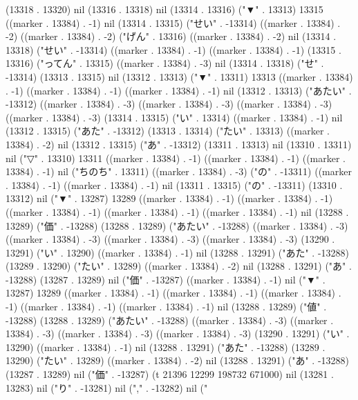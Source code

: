 (13318 . 13320) nil (13316 . 13318) nil (13314 . 13316) ("▼" . 13313) 13315 ((marker . 13384) . -1) nil (13314 . 13315) ("せい" . -13314) ((marker . 13384) . -2) ((marker . 13384) . -2) ("げん" . 13316) ((marker . 13384) . -2) nil (13314 . 13318) ("せい" . -13314) ((marker . 13384) . -1) ((marker . 13384) . -1) (13315 . 13316) ("ってん" . 13315) ((marker . 13384) . -3) nil (13314 . 13318) ("せ" . -13314) (13313 . 13315) nil (13312 . 13313) ("▼" . 13311) 13313 ((marker . 13384) . -1) ((marker . 13384) . -1) ((marker . 13384) . -1) nil (13312 . 13313) ("あたい" . -13312) ((marker . 13384) . -3) ((marker . 13384) . -3) ((marker . 13384) . -3) ((marker . 13384) . -3) (13314 . 13315) ("い" . 13314) ((marker . 13384) . -1) nil (13312 . 13315) ("あた" . -13312) (13313 . 13314) ("たい" . 13313) ((marker . 13384) . -2) nil (13312 . 13315) ("あ" . -13312) (13311 . 13313) nil (13310 . 13311) nil ("▽" . 13310) 13311 ((marker . 13384) . -1) ((marker . 13384) . -1) ((marker . 13384) . -1) nil ("ちのち" . 13311) ((marker . 13384) . -3) ("の" . -13311) ((marker . 13384) . -1) ((marker . 13384) . -1) nil (13311 . 13315) ("の" . -13311) (13310 . 13312) nil ("▼" . 13287) 13289 ((marker . 13384) . -1) ((marker . 13384) . -1) ((marker . 13384) . -1) ((marker . 13384) . -1) ((marker . 13384) . -1) nil (13288 . 13289) ("価" . -13288) (13288 . 13289) ("あたい" . -13288) ((marker . 13384) . -3) ((marker . 13384) . -3) ((marker . 13384) . -3) ((marker . 13384) . -3) (13290 . 13291) ("い" . 13290) ((marker . 13384) . -1) nil (13288 . 13291) ("あた" . -13288) (13289 . 13290) ("たい" . 13289) ((marker . 13384) . -2) nil (13288 . 13291) ("あ" . -13288) (13287 . 13289) nil ("価" . -13287) ((marker . 13384) . -1) nil ("▼" . 13287) 13289 ((marker . 13384) . -1) ((marker . 13384) . -1) ((marker . 13384) . -1) ((marker . 13384) . -1) ((marker . 13384) . -1) nil (13288 . 13289) ("値" . -13288) (13288 . 13289) ("あたい" . -13288) ((marker . 13384) . -3) ((marker . 13384) . -3) ((marker . 13384) . -3) ((marker . 13384) . -3) (13290 . 13291) ("い" . 13290) ((marker . 13384) . -1) nil (13288 . 13291) ("あた" . -13288) (13289 . 13290) ("たい" . 13289) ((marker . 13384) . -2) nil (13288 . 13291) ("あ" . -13288) (13287 . 13289) nil ("価" . -13287) (t 21396 12299 198732 671000) nil (13281 . 13283) nil ("り" . -13281) nil ("," . -13282) nil ("
